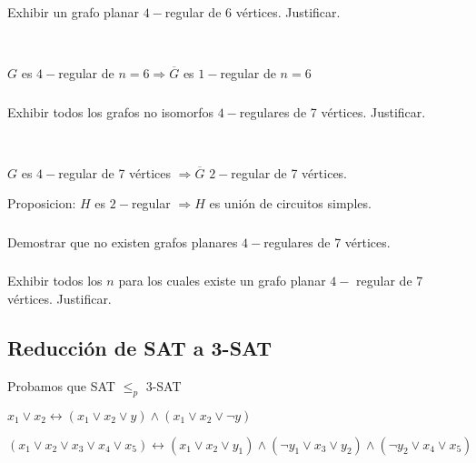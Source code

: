 \subsubsection{}
Exhibir un grafo planar $4-$regular de 6 vértices. Justificar.

~

$G$ es $4-$regular de $n = 6 \Longrightarrow \overline{G}$ es $1-$regular de $n = 6$

\subsubsection{}
Exhibir todos los grafos no isomorfos $4-$regulares de 7 vértices. Justificar.

~

$G$ es $4-$regular de 7 vértices $\Longrightarrow \overline{G}$ $2-$regular de 7 vértices.

Proposicion: $H$ es $2-$regular $\Longrightarrow H$ es unión de circuitos simples.

\subsubsection{}
Demostrar que no existen grafos planares $4-$regulares de 7 vértices.

\subsubsection{}
Exhibir todos los $n$ para los cuales existe un grafo planar $4-$ regular de 7 vértices. Justificar.

\subsection{Reducción de SAT a 3-SAT}

Probamos que SAT $\leq_p$ 3-SAT

$x_1 \lor x_2 \longleftrightarrow (x_1 \lor x_2 \lor y) \land (x_1 \lor x_2 \lor \neg y)$

$(x_1 \lor x_2 \lor x_3 \lor x_4 \lor x_5) \longleftrightarrow (x_1 \lor x_2 \lor y_1) \land (\neg y_1 \lor x_3 \lor y_2) \land (\neg y_2 \lor x_4 \lor x_5)$